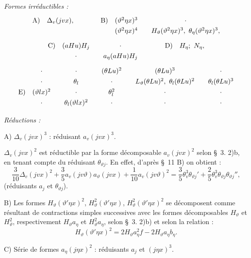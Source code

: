 \documentclass[11pt]{article}
\newcommand{\A}{\Delta}
\begin{document}
\noindent\emph{Formes irréductibles :}
\[
\renewcommand{\arraystretch}{1.28}
\begin{array}{@{}r@{\quad}c@{\qquad\qquad}r@{\quad}c@{\qquad}c@{}}
\text{A)}&\A_v(jv x),&\text{B)}&(\vartheta^2\eta x)^3&\cdot\\
&&&(\vartheta^2\eta x)^4&H_\vartheta(\vartheta^2\eta x)^3,\ \theta_\eta(\vartheta^2\eta x)^3,
\end{array}
\]
\[
\renewcommand{\arraystretch}{1.28}
\begin{array}{@{}r@{\quad}c@{\qquad}c@{\qquad\qquad}r@{\quad}c@{}}
\text{C)}&(aHu)H_j&\cdot&\text{D)}&H_\eta;\ N_\eta,\\
&\cdot&a_\eta(aHu)H_j&&
\end{array}
\]
\[
\renewcommand{\arraystretch}{1.30}
\begin{array}{@{}r@{\quad}c@{\qquad}c@{\qquad}c@{\qquad}c@{\qquad}c@{}}
&\cdot&\cdot&(\theta Lu)^2&(\theta Lu)^3&\cdot\\
&\cdot&\theta_l&\cdot&L_\vartheta(\theta Lu)^2,\ \theta_l(\theta Lu)^2&\theta_l(\theta Lu)^3\\
\text{E)}&(\vartheta lx)^2&\cdot&\theta_l^2&\cdot&\cdot\\
&\cdot&\theta_l(\vartheta lx)^2&\cdot&\cdot&\cdot
\end{array}
\]

\noindent\emph{Réductions :}

\noindent A) $\A_v(jv x)^3$ : réduisant $a_v(jv x)^3$.

$\A_v(jv x)^2$ est réductible par la forme décomposable $a_v(jv x)^2$ selon \S\ 3. 2)b, en tenant compte du réduisant $\theta_{\vartheta j}$. En effet, d'après \S\ 11 B) on obtient :
\[
\frac3{10}\A_v(jv x)^2+\frac35a_v(jv\vartheta)a_\vartheta(jv x)
+\frac1{10}a_v(jv\vartheta)^2
=\frac35\theta_v^3\theta_{\vartheta j}'+\frac25\theta_v^3\theta_{\vartheta j}\theta_{\vartheta j}'',
\]
(réduisants $a_j$ et $\theta_{\vartheta j}$).

\noindent B) Les formes $H_\vartheta(\vartheta'\eta x)^2$, $H_\vartheta^2(\vartheta'\eta x)$, $H_\vartheta^2(\vartheta'\eta x)^2$ se décomposent comme résultant de contractions simples successives avec les formes décomposables $H_\vartheta$ et $H_\vartheta^2$, respectivement $H_\vartheta a_\eta$ et $H_\vartheta^2a_\eta$, selon \S\ 3. 2)b) et selon la relation :
\[
H_\vartheta(\vartheta'\eta x)^2=2H_\vartheta a_\eta^2f-2H_\vartheta a_\eta b_\eta.
\]

\noindent C) Série de formes $a_\eta(j\eta x)^2$ : réduisants $a_j$ et $(j\eta x)^3$.
\end{document}

